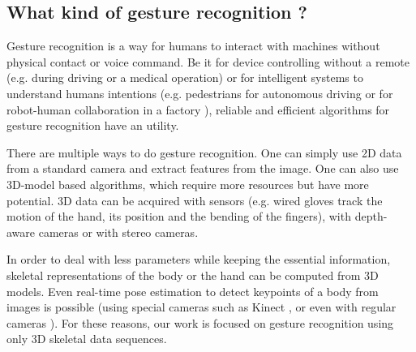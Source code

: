 \documentclass{article}
\begin{document}
\subsection{What kind of gesture recognition ?}
Gesture recognition is a way for humans to interact with machines without physical contact or voice command. Be it for device controlling without a remote (e.g. during driving or a medical operation) or for intelligent systems to understand humans intentions (e.g. pedestrians for autonomous driving \cite{intro-autonomous-driving} or for robot-human collaboration in a factory \cite{coupete:hal-01306482}), reliable and efficient algorithms for gesture recognition have an utility.
\par
There are multiple ways to do gesture recognition. One can simply use 2D data from a standard camera and extract features from the image. One can also use 3D-model based algorithms, which require more resources but have more potential. 3D data can be acquired with sensors (e.g. wired gloves track the motion of the hand, its position and the bending of the fingers), with depth-aware cameras or with stereo cameras.
\par
In order to deal with less parameters while keeping the essential information, skeletal representations of the body or the hand can be computed from 3D models. Even real-time pose estimation to detect keypoints of a body from images is possible (using special cameras such as Kinect \cite{real-time-human-pose-recognition-in-parts-from-a-single-depth-image}, or even with regular cameras \cite{simon2017hand-openpose}). For these reasons, our work is focused on gesture recognition using only 3D skeletal data sequences.
\par
\end{document}
